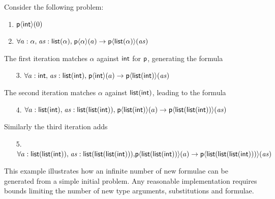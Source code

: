 \documentclass[runningheads]{llncs}
\begin{document}
\begin{examplex}Consider the following problem:
\begin{enumerate}
   \item \(\textsf{p}\langle \textsf{int}\rangle(0)\)
   \item \(\forall a: \alpha{,}\; \mathit{as}:\textsf{list}(\alpha){,}\; \textsf{p}\langle\alpha\rangle(a) \rightarrow \textsf{p}\langle \textsf{list}(\alpha)\rangle(\mathit{as})\)
\end{enumerate}
%
The first iteration matches \(\alpha\) against \(\textsf{int}\) for $\textsf{p}$, generating the formula
%
\begin{enumerate}
   \item[3.] \(\forall a: \textsf{int}{,}\; \mathit{as}:\textsf{list}(\textsf{int}){,}\; \textsf{p}\langle\textsf{int}\rangle(a) \rightarrow \textsf{p}\langle \textsf{list}(\textsf{int})\rangle(\mathit{as})\)
\end{enumerate}
%
The second iteration matches \(\alpha\) against \(\textsf{list}(\textsf{int})\), leading to the formula
%
\begin{enumerate}
   \item[4.] \(\forall a: \textsf{list}(\textsf{int}){,}\; \mathit{as}:\textsf{list}(\textsf{list}(\textsf{int})){,}\; \textsf{p}\langle\textsf{list}(\textsf{int})\rangle(a) \rightarrow \textsf{p}\langle \textsf{list}(\textsf{list}(\textsf{int}))\rangle(\mathit{as})\)
\end{enumerate}
%
Similarly the third iteration adds
%
\begin{enumerate}
   \item[5.] 
         \( \forall a: \textsf{list}(\textsf{list}(\textsf{int})){,}\; \mathit{as}:\textsf{list}(\textsf{list}(\textsf{list}(\textsf{int}))){,} \\ \textsf{p}\langle\textsf{list}(\textsf{list}(\textsf{int}))\rangle(a) \rightarrow \textsf{p}\langle \textsf{list}(\textsf{list}(\textsf{list}(\textsf{int})))\rangle(\mathit{as})\)
\end{enumerate}

\end{examplex}

This example illustrates how an infinite number of new formulae can be generated from a simple initial problem.
Any reasonable implementation requires bounds limiting the number of new type arguments, substitutions and formulae.
\end{document}
